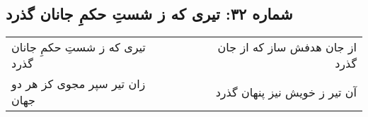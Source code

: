 \begin{center}
\section*{شماره ۳۲: تیری که ز شستِ حکمِ جانان گذرد}
\label{sec:032}
\begin{longtable}{l p{0.5cm} r}
تیری که ز شستِ حکمِ جانان گذرد
&&
از جان هدفش ساز که از جان گذرد
\\
زان تیر سپر مجوی کز هر دو جهان
&&
آن تیر ز خویش نیز پنهان گذرد
\\
\end{longtable}
\end{center}
